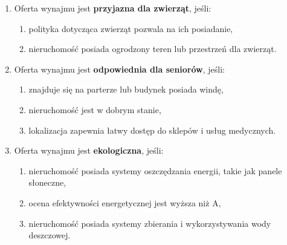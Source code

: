 \begin{enumerate}[label=W\arabic*.]
\begin{enumerate}[label=\arabic*.]
    \end{enumerate}
    \item Oferta wynajmu jest \textbf{przyjazna dla zwierząt}, jeśli:
    \begin{enumerate}[label=\arabic*.]
        \item polityka dotycząca zwierząt pozwala na ich posiadanie,
        \item nieruchomość posiada ogrodzony teren lub przestrzeń dla zwierząt.
    \end{enumerate}
    \item Oferta wynajmu jest \textbf{odpowiednia dla seniorów}, jeśli:
    \begin{enumerate}[label=\arabic*.]
        \item znajduje się na parterze lub budynek posiada windę,
        \item nieruchomość jest w dobrym stanie,
        \item lokalizacja zapewnia łatwy dostęp do sklepów i usług medycznych.
    \end{enumerate}
    \item Oferta wynajmu jest \textbf{ekologiczna}, jeśli:
    \begin{enumerate}[label=\arabic*.]
        \item nieruchomość posiada systemy oszczędzania energii, takie jak panele słoneczne,
        \item ocena efektywności energetycznej jest wyższa niż A,
        \item nieruchomość posiada systemy zbierania i wykorzystywania wody deszczowej.
    \end{enumerate}
\end{enumerate}


